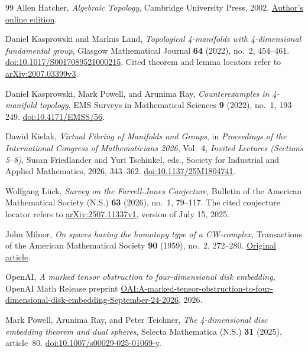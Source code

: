 \documentclass[11pt]{article}
\theoremstyle{definition}
\theoremstyle{remark}
\begin{document}
{\begin{thebibliography}{99}
Allen Hatcher,
\emph{Algebraic Topology},
Cambridge University Press, 2002.
\href{https://pi.math.cornell.edu/~hatcher/AT/ATpage.html}{Author's online edition}.

Daniel Kasprowski and Markus Land,
\emph{Topological 4-manifolds with 4-dimensional fundamental group},
Glasgow Mathematical Journal \textbf{64} (2022), no.~2, 454--461.
\href{https://doi.org/10.1017/S0017089521000215}{doi:10.1017/S0017089521000215}.
Cited theorem and lemma locators refer to
\href{https://arxiv.org/abs/2007.03399v3}{arXiv:2007.03399v3}.

Daniel Kasprowski, Mark Powell, and Arunima Ray,
\emph{Counterexamples in 4-manifold topology},
EMS Surveys in Mathematical Sciences \textbf{9} (2022), no.~1, 193--249.
\href{https://doi.org/10.4171/EMSS/56}{doi:10.4171/EMSS/56}.

Dawid Kielak,
\emph{Virtual Fibring of Manifolds and Groups},
in \emph{Proceedings of the International Congress of Mathematicians 2026},
Vol.~4, \emph{Invited Lectures (Sections 5--8)},
Susan Friedlander and Yuri Tschinkel, eds.,
Society for Industrial and Applied Mathematics, 2026, 343--362.
\href{https://doi.org/10.1137/25M1804741}{doi:10.1137/25M1804741}.

Wolfgang L\"uck,
\emph{Survey on the Farrell-Jones Conjecture},
Bulletin of the American Mathematical Society (N.S.) \textbf{63}
(2026), no.~1, 79--117.
The cited conjecture locator refers to
\href{https://arxiv.org/abs/2507.11337v1}{arXiv:2507.11337v1},
version of July 15, 2025.

John Milnor,
\emph{On spaces having the homotopy type of a CW-complex},
Transactions of the American Mathematical Society \textbf{90} (1959),
no.~2, 272--280.
\href{https://webhomes.maths.ed.ac.uk/~v1ranick/papers/milnorcw.pdf}{Original article}.

OpenAI,
\emph{A marked tensor obstruction to four-dimensional disk embedding},
OpenAI Math Release preprint
\href{https://github.com/openai/math/blob/main/preprints/A-marked-tensor-obstruction-to-four-dimensional-disk-embedding-September-24-2026/paper.pdf}{OAI:A-marked-tensor-obstruction-to-four-dimensional-disk-embedding-September-24-2026},
2026.

Mark Powell, Arunima Ray, and Peter Teichner,
\emph{The 4-dimensional disc embedding theorem and dual spheres},
Selecta Mathematica (N.S.) \textbf{31} (2025), article~80.
\href{https://doi.org/10.1007/s00029-025-01069-y}{doi:10.1007/s00029-025-01069-y}.


\end{thebibliography}}
\end{document}
